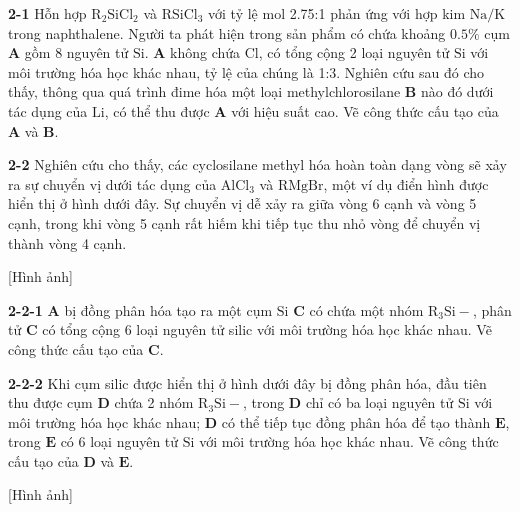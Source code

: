 \vspace{0.2cm}

\noindent
\textbf{2-1} Hỗn hợp $\mathrm{R_2SiCl_2}$ và $\mathrm{RSiCl_3}$ với tỷ lệ mol 2.75:1 phản ứng với hợp kim $\mathrm{Na/K}$ trong naphthalene. Người ta phát hiện trong sản phẩm có chứa khoảng $0.5\%$ cụm $\mathbf{A}$ gồm 8 nguyên tử $\mathrm{Si}$. $\mathbf{A}$ không chứa $\mathrm{Cl}$, có tổng cộng 2 loại nguyên tử $\mathrm{Si}$ với môi trường hóa học khác nhau, tỷ lệ của chúng là 1:3. Nghiên cứu sau đó cho thấy, thông qua quá trình đime hóa một loại methylchlorosilane $\mathbf{B}$ nào đó dưới tác dụng của $\mathrm{Li}$, có thể thu được $\mathbf{A}$ với hiệu suất cao. Vẽ công thức cấu tạo của $\mathbf{A}$ và $\mathbf{B}$.

\vspace{0.2cm}

\noindent
\textbf{2-2} Nghiên cứu cho thấy, các cyclosilane methyl hóa hoàn toàn dạng vòng sẽ xảy ra sự chuyển vị dưới tác dụng của $\mathrm{AlCl_3}$ và $\mathrm{RMgBr}$, một ví dụ điển hình được hiển thị ở hình dưới đây. Sự chuyển vị dễ xảy ra giữa vòng 6 cạnh và vòng 5 cạnh, trong khi vòng 5 cạnh rất hiếm khi tiếp tục thu nhỏ vòng để chuyển vị thành vòng 4 cạnh.

\begin{center}
    [Hình ảnh]
\end{center}

\noindent
\textbf{2-2-1} $\mathbf{A}$ bị đồng phân hóa tạo ra một cụm $\mathrm{Si}$ $\mathbf{C}$ có chứa một nhóm $\mathrm{R_3Si-}$, phân tử $\mathbf{C}$ có tổng cộng 6 loại nguyên tử silic với môi trường hóa học khác nhau. Vẽ công thức cấu tạo của $\mathbf{C}$.

\vspace{0.2cm}

\noindent
\textbf{2-2-2} Khi cụm silic được hiển thị ở hình dưới đây bị đồng phân hóa, đầu tiên thu được cụm $\mathbf{D}$ chứa 2 nhóm $\mathrm{R_3Si-}$, trong $\mathbf{D}$ chỉ có ba loại nguyên tử $\mathrm{Si}$ với môi trường hóa học khác nhau; $\mathbf{D}$ có thể tiếp tục đồng phân hóa để tạo thành $\mathbf{E}$, trong $\mathbf{E}$ có 6 loại nguyên tử $\mathrm{Si}$ với môi trường hóa học khác nhau. Vẽ công thức cấu tạo của $\mathbf{D}$ và $\mathbf{E}$.

\begin{center}
    [Hình ảnh]
\end{center}

\vspace{0.2cm}

